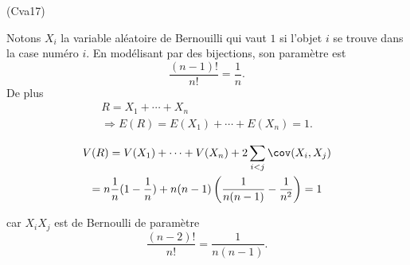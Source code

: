  \begin{tiny}(Cva17)\end{tiny} Notons $X_i$ la variable aléatoire de Bernouilli qui vaut $1$ si l'objet $i$ se trouve dans la case numéro $i$. En modélisant par des bijections, son paramètre est 
 \[
  \frac{(n-1)!}{n!} = \frac{1}{n}.
 \]
De plus
 \begin{multline*}
  R = X_1 + \cdots + X_n \\
  \Rightarrow E(R) = E(X_1) + \cdots + E(X_n) = 1.
 \end{multline*}

\begin{multline*}
 V(R) = V(X_1) + \cdots + V(X_n) + 2\sum_{i < j} \cov(X_i,X_j)\\
 = n \frac{1}{n}(1-\frac{1}{n}) + n(n-1)\left( \frac{1}{n(n-1)} - \frac{1}{n^2}\right) = 1
\end{multline*}

car $X_iX_j$ est de Bernoulli de paramètre 
\[
 \frac{(n-2)!}{n!} =\frac{1}{n(n-1)}.
\]
